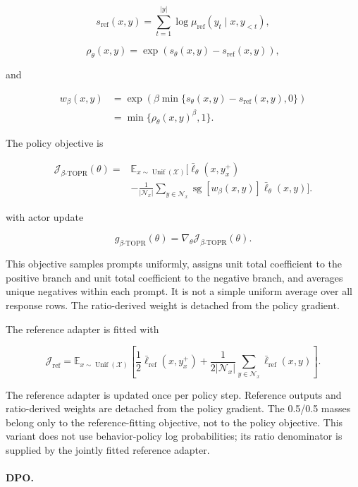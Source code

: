 \documentclass{article}
\theoremstyle{plain}
\theoremstyle{definition}
\theoremstyle{remark}
\begin{document}
\[
s_{\mathrm{ref}}(x,y)
=
\sum_{t=1}^{|y|}
\log\mu_{\mathrm{ref}}(y_t\mid x,y_{<t}),
\]

\[
\rho_\theta(x,y)
=
\exp\!\left(s_\theta(x,y)-s_{\mathrm{ref}}(x,y)\right),
\]

and

\[
\begin{aligned}
w_\beta(x,y)
&=
\exp\!\left(
\beta\min\{s_\theta(x,y)-s_{\mathrm{ref}}(x,y),0\}
\right) \\
&=
\min\{\rho_\theta(x,y)^\beta,1\}.
\end{aligned}
\]

The policy objective is

\[
\begin{aligned}
\mathcal J_{\beta\text{-}\mathrm{TOPR}}(\theta)
={}&
\mathbb E_{x\sim\operatorname{Unif}(\mathcal X)}
\Bigg[
\bar{\ell}_\theta(x,y_x^+) \\
&-
\frac{1}{|\mathcal N_x|}
\sum_{y\in\mathcal N_x}
\operatorname{sg}[w_\beta(x,y)]
\bar{\ell}_\theta(x,y)
\Bigg].
\end{aligned}
\]

with actor update

\[
g_{\beta\text{-}\mathrm{TOPR}}(\theta)
=
\nabla_\theta\mathcal J_{\beta\text{-}\mathrm{TOPR}}(\theta).
\]

This objective samples prompts uniformly, assigns unit total
coefficient to the positive branch and unit total coefficient to the
negative branch, and averages unique negatives within each prompt. It
is not a simple uniform average over all response rows. The
ratio-derived weight is detached from the policy gradient.

The reference adapter is fitted with

\[
\mathcal J_{\mathrm{ref}}
=
\mathbb E_{x\sim\operatorname{Unif}(\mathcal X)}
\left[
\frac{1}{2}\bar{\ell}_{\mathrm{ref}}(x,y_x^+)
+
\frac{1}{2|\mathcal N_x|}
\sum_{y\in\mathcal N_x}
\bar{\ell}_{\mathrm{ref}}(x,y)
\right].
\]

The reference adapter is updated once per policy step. Reference
outputs and ratio-derived weights are detached from the policy
gradient. The 0.5/0.5 masses belong only to the reference-fitting
objective, not to the policy objective. This variant does not use behavior-policy log probabilities; its ratio
denominator is supplied by the jointly fitted reference adapter.

\paragraph{DPO.}
\end{document}
